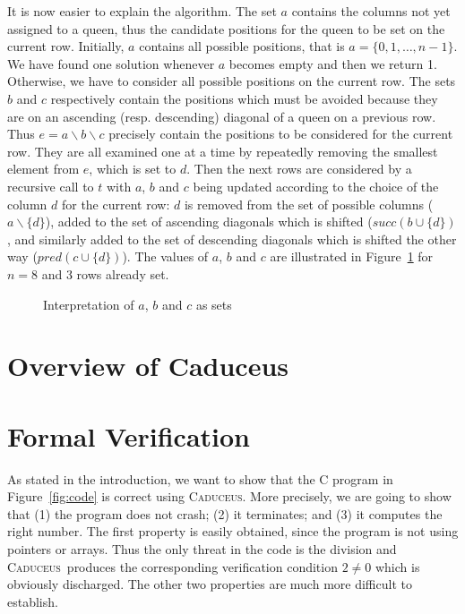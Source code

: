\documentclass[a4paper]{llncs}
\newcommand{\caduceus}{\textsc{Caduceus}}
\begin{document}
It is now easier to explain the algorithm. The set $a$ contains the
columns not yet assigned to a queen, thus the candidate positions
for the queen to be set on the current row. Initially, $a$ contains
all possible positions, that is  $a = \{0,1,\dots,n-1\}$. 
We have found one solution whenever $a$ becomes empty and then we return 1.
Otherwise, we have to consider all possible positions on the current
row. The sets $b$ and $c$ respectively contain the positions which
must be avoided because they are on an ascending (resp. descending)
diagonal of a queen on a previous row.
Thus $e = a\backslash b\backslash c$ precisely contain the positions to be
considered for the current row. They are all examined one at a time by
repeatedly removing the smallest element from $e$, which is set to $d$.
Then the next rows are considered by a recursive call to $t$ with $a$,
$b$ and $c$ being updated according to the choice of the column $d$
for the current row: $d$ is removed from the set of possible columns
($a\backslash\{d\}$), added to the set of ascending diagonals which is
shifted ($\mathit{succ}(b\cup\{d\})$, and similarly  added to the set of
descending diagonals which is shifted the other way
($\mathit{pred}(c\cup\{d\})$). 
The values of $a$, $b$ and $c$ are illustrated in Figure~\ref{fig:abc}
for $n=8$ and 3 rows already set.

\begin{figure}
  \hspace*{-3em}
  \caption{Interpretation of $a$, $b$ and $c$ as sets}
  \label{fig:abc}
\end{figure}

\section{Overview of Caduceus}\label{caduceus}

\cite{caduceus,FilliatreMarche04} \cite{why}

\cite{simplify} \cite{yices} \cite{ergo} \cite{coq}


\section{Formal Verification}\label{verif}

As stated in the introduction, we want to show that the C program in
Figure~\ref{fig:code} is correct using \caduceus. More precisely, we
are going to show that (1) the program does not crash; (2)
it terminates; and (3) it computes the right number.
The first property is easily obtained, since the program is not using
pointers or arrays. Thus the only threat in the code is the division and
\caduceus\ produces the corresponding verification condition $2\not=0$
which is obviously discharged. The other two properties are much more
difficult to establish.
\end{document}
